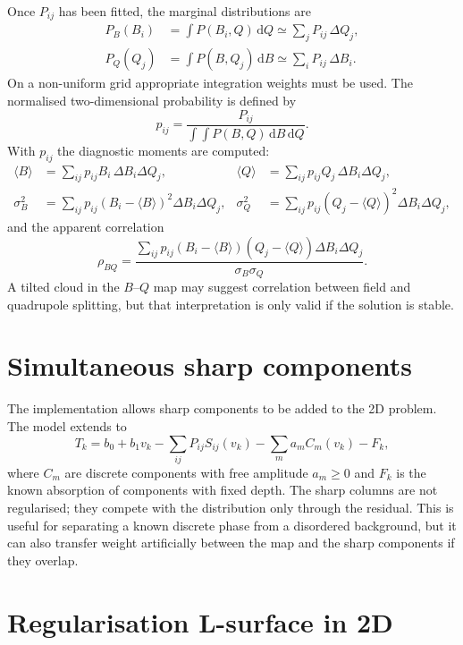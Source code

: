 \documentclass[11pt,a4paper]{article}
\newcommand{\dd}{\mathrm{d}}
\begin{document}
Once $P_{ij}$ has been fitted, the marginal distributions are
\begin{align}
  P_B(B_i) &= \int P(B_i,Q)\,\dd Q \simeq \sum_j P_{ij}\,\Delta Q_j,\\
  P_Q(Q_j) &= \int P(B,Q_j)\,\dd B \simeq \sum_i P_{ij}\,\Delta B_i.
\end{align}
On a non-uniform grid appropriate integration weights must be used. The
normalised two-dimensional probability is defined by
\begin{equation}
  p_{ij}=\frac{P_{ij}}{\int\!\int P(B,Q)\,\dd B\,\dd Q}.
\end{equation}
With $p_{ij}$ the diagnostic moments are computed:
\begin{align}
  \langle B\rangle &= \sum_{ij} p_{ij} B_i\,\Delta B_i\Delta Q_j, &
  \langle Q\rangle &= \sum_{ij} p_{ij} Q_j\,\Delta B_i\Delta Q_j,\\
  \sigma_B^2 &= \sum_{ij} p_{ij}(B_i-\langle B\rangle)^2\Delta B_i\Delta Q_j, &
  \sigma_Q^2 &= \sum_{ij} p_{ij}(Q_j-\langle Q\rangle)^2\Delta B_i\Delta Q_j,
\end{align}
and the apparent correlation
\begin{equation}
  \rho_{BQ}=\frac{\sum_{ij}p_{ij}(B_i-\langle B\rangle)(Q_j-\langle Q\rangle)
  \Delta B_i\Delta Q_j}{\sigma_B\sigma_Q}.
\end{equation}
A tilted cloud in the $B$--$Q$ map may suggest correlation between field and
quadrupole splitting, but that interpretation is only valid if the solution is
stable.

\section{Simultaneous sharp components}

The implementation allows sharp components to be added to the 2D problem. The
model extends to
\begin{equation}
  T_k=b_0+b_1v_k-\sum_{ij}P_{ij}S_{ij}(v_k)-\sum_m a_m C_m(v_k)-F_k,
\end{equation}
where $C_m$ are discrete components with free amplitude $a_m\ge0$ and $F_k$ is
the known absorption of components with fixed depth. The sharp columns are not
regularised; they compete with the distribution only through the residual. This
is useful for separating a known discrete phase from a disordered background,
but it can also transfer weight artificially between the map and the sharp
components if they overlap.

\section{Regularisation L-surface in 2D}
\end{document}
